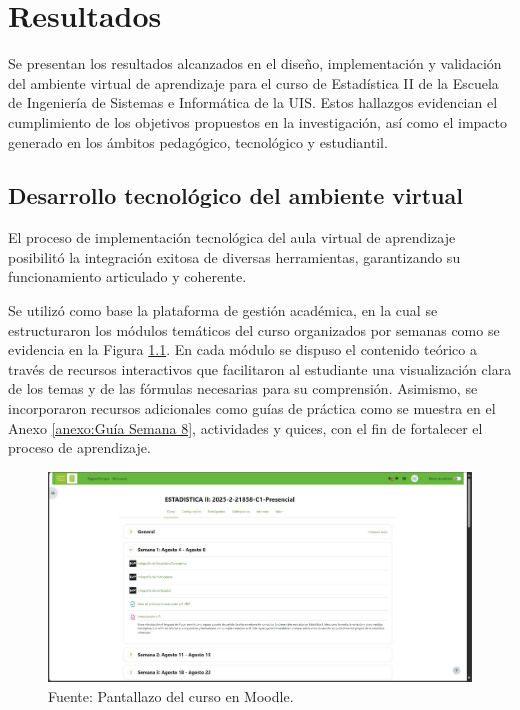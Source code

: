 \documentclass[letter,oneside,12pt,spanish]{report}
\begin{document}
\newpage

\chapter{Resultados}

Se presentan los resultados alcanzados en el diseño, implementación y validación del ambiente virtual de aprendizaje para el curso de Estadística II de la Escuela de Ingeniería de Sistemas e Informática de la UIS. Estos hallazgos evidencian el cumplimiento de los objetivos propuestos en la investigación, así como el impacto generado en los ámbitos pedagógico, tecnológico y estudiantil.

\section{Desarrollo tecnológico del ambiente virtual}

El proceso de implementación tecnológica del aula virtual de aprendizaje posibilitó la integración exitosa de diversas herramientas, garantizando su funcionamiento articulado y coherente.

Se utilizó como base la plataforma de gestión académica, en la cual se estructuraron los módulos temáticos del curso organizados por semanas como se evidencia en la Figura \ref{fig:Moodle}. En cada módulo se dispuso el contenido teórico a través de recursos interactivos que facilitaron al estudiante una visualización clara de los temas y de las fórmulas necesarias para su comprensión. Asimismo, se incorporaron recursos adicionales como guías de práctica como se muestra en el Anexo \ref{anexo:Guía Semana 8}, actividades y quices, con el fin de fortalecer el proceso de aprendizaje. 

\begin{figure}[ht]
	\centering
	\includegraphics[width=1\textwidth]{Figs/Moodle.pdf}
	\label{fig:Moodle}
	\\Fuente: Pantallazo del curso en Moodle.
\end{figure}
\end{document}
